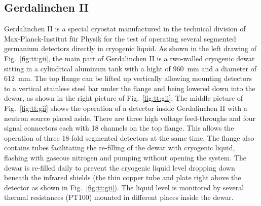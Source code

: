 \subsection{Gerdalinchen II}
\label{sec:tt:gii}
Gerdalinchen II is a special cryostat manufactured in the technical division of Max-Planck-Institut f\"ur Physik for the test of operating several segmented germanium detectors directly in cryogenic liquid. As shown in the left drawing of Fig.~\ref{fig:tt:gii}, the main part of Gerdalinchen II is a two-walled cryogenic dewar sitting in a cylindrical aluminum tank with a hight of 960~mm and a diameter of 612~mm. The top flange can be lifted up vertically allowing mounting detectors to a vertical stainless steel bar under the flange and being lowered down into the dewar, as shown in the right picture of Fig.~\ref{fig:tt:gii}. The middle picture of Fig.~\ref{fig:tt:gii} shows the operation of a detector inside Gerdalinchen II with a neutron source placed aside. There are three high voltage feed-throughs and four signal connectors each with 18 channels on the top flange. This allows the operation of three 18-fold segmented detectors at the same time. The flange also contains tubes facilitating the re-filling of the dewar with cryogenic liquid, flashing with gaseous nitrogen and pumping without opening the system. The dewar is re-filled daily to prevent the cryogenic liquid level dropping down beneath the infrared shields (the thin copper tube and plate right above the detector as shown in Fig.~\ref{fig:tt:gii}). The liquid level is monitored by several thermal resistances (PT100) mounted in different places inside the dewar.

